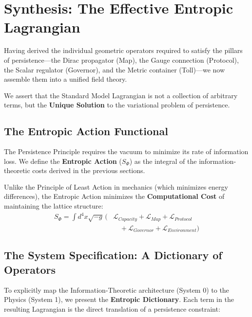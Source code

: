\section{Synthesis: The Effective Entropic Lagrangian}
\label{sec:synthesis}

Having derived the individual geometric operators required to satisfy the pillars of persistence—the Dirac propagator (Map), the Gauge connection (Protocol), the Scalar regulator (Governor), and the Metric container (Toll)—we now assemble them into a unified field theory.

We assert that the Standard Model Lagrangian is not a collection of arbitrary terms, but the \textbf{Unique Solution} to the variational problem of persistence.

\subsection{The Entropic Action Functional}
The Persistence Principle requires the vacuum to minimize its rate of information loss. We define the \textbf{Entropic Action} ($S_\Phi$) as the integral of the information-theoretic costs derived in the previous sections. 

Unlike the Principle of Least Action in mechanics (which minimizes energy differences), the Entropic Action minimizes the \textbf{Computational Cost} of maintaining the lattice structure:
\begin{equation}
\begin{split}
    S_\Phi = \int d^4x \sqrt{-g} \, \Big( &\mathcal{L}_{Capacity} + \mathcal{L}_{Map} + \mathcal{L}_{Protocol} \\
    & \quad + \mathcal{L}_{Governor} + \mathcal{L}_{Environment} \Big)
\end{split}
\end{equation}

\subsection{The System Specification: A Dictionary of Operators}
To explicitly map the Information-Theoretic architecture (System 0) to the Physics (System 1), we present the \textbf{Entropic Dictionary}. Each term in the resulting Lagrangian is the direct translation of a persistence constraint:

